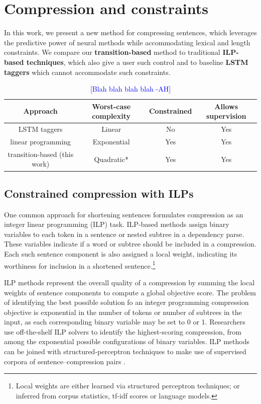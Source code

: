 \documentclass[11pt,a4paper]{article}
\newcommand{\ahcomment}[1]{\textcolor{blue}{[#1 -AH]}}
\begin{document}
\section{Compression and constraints}

In this work, we present a new method for compressing sentences, which leverages the predictive power of neural methods while accommodating lexical and length constraints. We compare our \textbf{transition-based} method to traditional \textbf{ILP-based techniques}, which also give a user such control and to baseline \textbf{LSTM taggers} which cannot accommodate such constraints.


\begin{table}[htb!]
\begin{tabular}{cccc}
\textbf{Approach} & \textbf{Worst-case complexity} & \textbf{Constrained} & \textbf{Allows supervision} \\ \hline
LSTM taggers      & Linear              & No     &    Yes      \\   
linear programming              & Exponential         & Yes    &    Yes   \\
transition-based (this work)       & Quadratic*           & Yes    &      Yes   \\
\end{tabular}
\caption{\ahcomment{Blah blah blah blah}}
\end{table}

\subsection{Constrained compression with ILPs}

One common approach for shortening sentences formulates compression as an integer linear programming (ILP) task. ILP-based methods assign binary variables to each token in a sentence or nested subtree in a dependency parse. These variables indicate if a word or subtree should be included in a compression. Each such sentence component is also assigned a local weight, indicating its worthiness for inclusion in a shortened sentence.\footnote{Local weights are either learned via structured perceptron techniques; or inferred from corpus statistics, tf-idf scores or language models.}

ILP methods represent the overall quality of a compression by summing the local weights of sentence components to compute a global objective score.  The problem of identifying the best possible solution fo an integer programming compression objective is exponential in the number of tokens or number of subtrees in the input, as each corresponding binary variable may be set to 0 or 1. Researchers use off-the-shelf ILP solvers to identify the highest-scoring compression, from among the exponential possible configurations of binary variables. ILP methods can be joined with structured-perceptron techniques to make use of supervised corpora of sentence--compression pairs \cite{filippova2013overcoming}.
\end{document}
